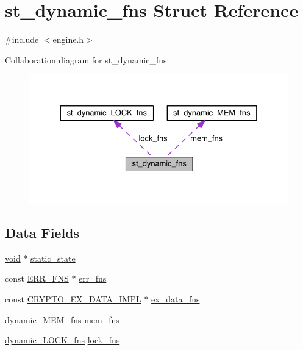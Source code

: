 \hypertarget{structst__dynamic__fns}{}\section{st\+\_\+dynamic\+\_\+fns Struct Reference}
\label{structst__dynamic__fns}


{\ttfamily \#include $<$engine.\+h$>$}



Collaboration diagram for st\+\_\+dynamic\+\_\+fns\+:\nopagebreak
\begin{figure}[H]
\begin{center}
\leavevmode
\includegraphics[width=330pt]{structst__dynamic__fns__coll__graph}
\end{center}
\end{figure}
\subsection*{Data Fields}
\begin{DoxyCompactItemize}
\item 
\hyperlink{hw__4758__cca_8h_afad4d591c7931ff6dc5bf69c76c96aa0}{void} $\ast$ \hyperlink{structst__dynamic__fns_a6122a12b836a720e29b301da5a372454}{static\+\_\+state}
\item 
const \hyperlink{crypto_2ossl__typ_8h_a10b7dacb50be04639fd1cb4f3b7198a9}{E\+R\+R\+\_\+\+F\+NS} $\ast$ \hyperlink{structst__dynamic__fns_a9c7ca79338e99c91dbc050e8e2b744b6}{err\+\_\+fns}
\item 
const \hyperlink{crypto_2crypto_8h_a52be5518c28d0ef05f97c978a9fde2e4}{C\+R\+Y\+P\+T\+O\+\_\+\+E\+X\+\_\+\+D\+A\+T\+A\+\_\+\+I\+M\+PL} $\ast$ \hyperlink{structst__dynamic__fns_a7c30961d2a84d87eb7232f1dd1a58082}{ex\+\_\+data\+\_\+fns}
\item 
\hyperlink{crypto_2engine_2engine_8h_a2b06e488f6d34900633783c7ff4b12b5}{dynamic\+\_\+\+M\+E\+M\+\_\+fns} \hyperlink{structst__dynamic__fns_a229ed80675b275e74c412fd89b7363f9}{mem\+\_\+fns}
\item 
\hyperlink{crypto_2engine_2engine_8h_a565954d93bcb51b49d06cad8ddf874cd}{dynamic\+\_\+\+L\+O\+C\+K\+\_\+fns} \hyperlink{structst__dynamic__fns_a53d0c584ab35cfcfa4e86440d2b529ed}{lock\+\_\+fns}
\end{DoxyCompactItemize}


